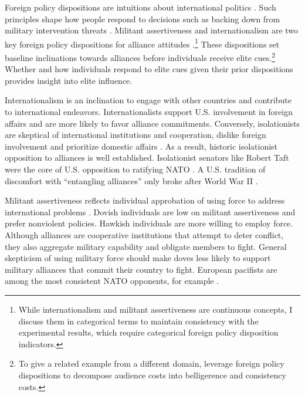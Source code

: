 \documentclass[12pt]{article}
\begin{document}
Foreign policy dispositions are intuitions about international politics \citep{KertzerTingley2018}. 
Such principles shape how people respond to decisions such as backing down from military intervention threats \citep{KertzerBrutger2016}. 
Militant assertiveness and internationalism are two key foreign policy dispositions for alliance attitudes \citep{Herrmannetal1999}.\footnote{While internationalism and militant assertiveness are continuous concepts, I discuss them in categorical terms to maintain consistency with the experimental results, which require categorical foreign policy disposition indicators.}
These dispositions set baseline inclinations towards alliances before individuals receive elite cues.\footnote{To give a related example from a different domain, \citet{KertzerBrutger2016} leverage foreign policy dispositions to decompose audience costs into belligerence and consistency costs.}
Whether and how individuals respond to elite cues given their prior dispositions provides insight into elite influence. 


Internationalism is an inclination to engage with other countries and contribute to international endeavors. 
Internationalists support U.S. involvement in foreign affairs and are more likely to favor alliance commitments. 
Conversely, isolationists are skeptical of international institutions and cooperation, dislike foreign involvement and prioritize domestic affairs \citep{Kertzer2013}. 
As a result, historic isolationist opposition to alliances is well established. 
Isolationist senators like Robert Taft were the core of U.S. opposition to ratifying NATO \citep{Kaplan2007}.
A U.S. tradition of discomfort with ``entangling alliances'' only broke after World War II \citep{Kupchan2020}.


Militant assertiveness reflects individual approbation of using force to address international problems \citep{Herrmannetal1999}. 
Dovish individuals are low on militant assertiveness and prefer nonviolent policies.
Hawkish individuals are more willing to employ force.
Although alliances are cooperative institutions that attempt to deter conflict, they also aggregate military capability and obligate members to fight.
General skepticism of using military force should make doves less likely to support military alliances that commit their country to fight.  
European pacifists are among the most consistent NATO opponents, for example \citep{Thies2015}.
\end{document}
